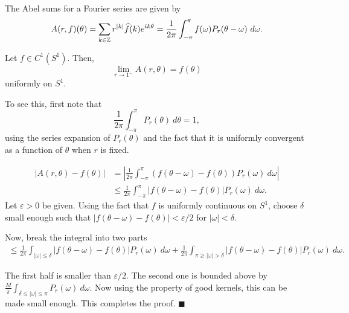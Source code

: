 The Abel sums for a Fourier series are given by 
\begin{equation*}
    A(r, f)(\theta) = \sum_{k\in\mathbb{Z}} r^{|k|}\widehat{f}(k)e^{ik\theta} = \frac{1}{2\pi}\int_{-\pi}^\pi f(\omega)P_r(\theta - \omega)~d\omega.
\end{equation*}

\begin{theorem}
    Let $f\in C^1(S^1)$. Then, 
    \begin{equation*}
        \lim_{r\to 1^-} A(r, \theta) = f(\theta)
    \end{equation*}
    uniformly on $S^1$.
\end{theorem}

To see this, first note that 
\begin{equation*}
    \frac{1}{2\pi}\int_{-\pi}^\pi P_r(\theta)~d\theta = 1,
\end{equation*}
using the series expansion of $P_r(\theta)$ and the fact that it is uniformly convergent as a function of $\theta$ when $r$ is fixed.

\begin{align*}
    |A(r,\theta) - f(\theta)| &= \left|\frac{1}{2\pi}\int_{-\pi}^\pi \left(f(\theta - \omega) - f(\theta)\right)P_r(\omega)~d\omega\right|\\
    &\le\frac{1}{2\pi}\int_{-\pi}^\pi|f(\theta - \omega) - f(\theta)| P_r(\omega)~d\omega.
\end{align*}
Let $\varepsilon > 0$ be given. Using the fact that $f$ is uniformly continuous on $S^1$, choose $\delta$ small enough such that $|f(\theta - \omega) - f(\theta)| < \varepsilon/2$ for $|\omega| < \delta$.

Now, break the integral into two parts 
\begin{align*}
    \le\frac{1}{2\pi}\int_{|\omega|\le\delta}|f(\theta - \omega) - f(\theta)| P_r(\omega)~d\omega + \frac{1}{2\pi}\int_{\pi\ge |\omega| > \delta}|f(\theta - \omega) - f(\theta)|P_r(\omega)~d\omega.
\end{align*}

The first half is smaller than $\varepsilon/2$. The second one is bounded above by $\frac{M}{\pi}\int_{\delta\le |\omega|\le \pi}P_r(\omega)~d\omega$. Now using the property of good kernels, this can be made small enough. This completes the proof. $\blacksquare$

